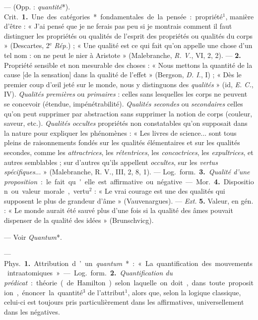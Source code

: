 
	\begin{itemize}[leftmargin=1cm, label=, itemsep=1pt]

 — (Opp. : {\it quantité}*). \si{Crit.} {\bf 1.} Une des
catégories* fondamentales de la pensée : propriété$^1$, manière d’être : «
J’ai pensé que je ne ferais pas peu si je montrais comment il faut distinguer
les propriétés ou qualités de l'esprit des propriétés ou qualités du corps
» (Descartes, 2$^\text{e}$ {\it Rép.}) ; « Une qualité est ce qui fait qu'on
appelle une chose d’un tel nom : on ne peut le nier à
Aristote » (Malebranche, {\it R. V.}, VI, 2, 2). — {\bf 2.} Propriété
sensible et non mesurable des choses : « Nous mettons la quantité de la cause
[de la sensation] dans la qualité de l'effet » (Bergson, {\it D. I.}, I) ; «
Dès le premier coup d'œil jeté sur le monde, nous y distinguons des {\it
qualités} » (id, {\it E. C.}, IV). {\it Qualités premières} ou {\it
primaires} : celles sans lesquelles les corps ne peuvent se concevoir
(étendue, impénétrabilité). {\it Qualités secondes} ou {\it secondaires}
celles qu'on peut supprimer par abstraction sans supprimer la notion de corps
(couleur, saveur, etc.). {\it Qualités occultes} propriétés non constatables
qu’on supposait dans la nature pour expliquer les phénomènes : « Les livres
de science... sont tous pleins de raisonnements fondés sur les qualités
élémentaires et sur les qualités secondes, comme les {\it attractrices}, les
{\it rétentrices}, les {\it concoctrices}, les {\it expultrices}, et autres
semblables ; sur d’autres qu'ils appellent {\it occultes}, sur les {\it
vertus spécifiques}... » (Malebranche, R. V., III, 2, 8, 1). — \si{Log.}
\si{form.} {\bf 3.} {\it Qualité d’une proposition} : le fait qu'elle est
affirmative ou négative.

— \si{Mor.} {\bf 4.} Disposition ou valeur morale, vertu$^2$ : « Le vrai
courage est une des qualités qui supposent le plus de grandeur d'âme
» (Vauvenargues). — {\it Ext.} {\bf 5.} Valeur, en gén. : « Le monde aurait
été sauvé plus d’une fois si la qualité des âmes pouvait dispenser de la
qualité des idées » (Brunschvicg).

 — Voir {\it Quantum}*.

 — \si{Phys.} {\bf 1.} Attribution d’un {\it quantum}* : «
La quantification des mouvements intraatomiques ». — \si{Log.} \si{form.}
{\bf 2.} {\it Quantification du prédicat} : théorie (de Hamilton) selon
laquelle on doit,
dans toute proposition, énoncer la quantité$^3$ de l’attribut$^1$, alors que,
selon la logique classique, celui-ci est toujours pris particulièrement dans
les affirmatives, universellement dans les négatives.


\end{itemize}
